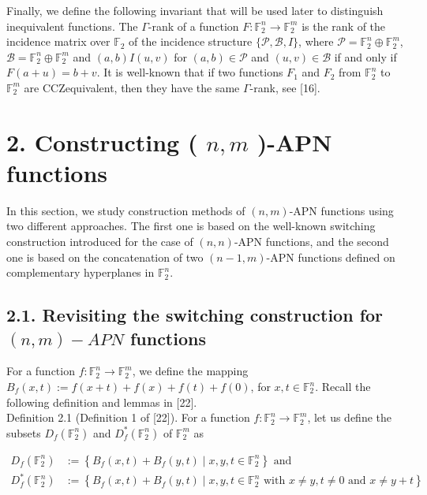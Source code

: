 \documentclass[10pt]{article}
\begin{document}
Finally, we define the following invariant that will be used later to distinguish inequivalent functions. The $\Gamma$-rank of a function $F: \mathbb{F}_{2}^{n} \rightarrow \mathbb{F}_{2}^{m}$ is the rank of the incidence matrix over $\mathbb{F}_{2}$ of the incidence structure $\{\mathcal{P}, \mathcal{B}, I\}$, where $\mathcal{P}=\mathbb{F}_{2}^{n} \oplus \mathbb{F}_{2}^{m}$, $\mathcal{B}=\mathbb{F}_{2}^{n} \oplus \mathbb{F}_{2}^{m}$ and $(a, b) I(u, v)$ for $(a, b) \in \mathcal{P}$ and $(u, v) \in \mathcal{B}$ if and only if $F(a+u)= b+v$. It is well-known that if two functions $F_{1}$ and $F_{2}$ from $\mathbb{F}_{2}^{n}$ to $\mathbb{F}_{2}^{m}$ are CCZequivalent, then they have the same $\Gamma$-rank, see [16].

\section*{2. Constructing ( $n, m$ )-APN functions}
In this section, we study construction methods of $(n, m)$-APN functions using two different approaches. The first one is based on the well-known switching construction introduced for the case of $(n, n)$-APN functions, and the second one is based on the concatenation of two $(n-1, m)$-APN functions defined on complementary hyperplanes in $\mathbb{F}_{2}^{n}$.

\subsection*{2.1. Revisiting the switching construction for $(n, m)-A P N$ functions}
For a function $f: \mathbb{F}_{2}^{n} \rightarrow \mathbb{F}_{2}^{m}$, we define the mapping $B_{f}(x, t):=f(x+t)+f(x)+ f(t)+f(0)$, for $x, t \in \mathbb{F}_{2}^{n}$. Recall the following definition and lemmas in [22].\\[0pt]
Definition 2.1 (Definition 1 of [22]). For a function $f: \mathbb{F}_{2}^{n} \rightarrow \mathbb{F}_{2}^{m}$, let us define the subsets $D_{f}\left(\mathbb{F}_{2}^{n}\right)$ and $D_{f}^{*}\left(\mathbb{F}_{2}^{n}\right)$ of $\mathbb{F}_{2}^{m}$ as

$$
\begin{aligned}
D_{f}\left(\mathbb{F}_{2}^{n}\right) & :=\left\{B_{f}(x, t)+B_{f}(y, t) \mid x, y, t \in \mathbb{F}_{2}^{n}\right\} \text { and } \\
D_{f}^{*}\left(\mathbb{F}_{2}^{n}\right) & :=\left\{B_{f}(x, t)+B_{f}(y, t) \mid x, y, t \in \mathbb{F}_{2}^{n} \text { with } x \neq y, t \neq 0 \text { and } x \neq y+t\right\}
\end{aligned}
$$
\end{document}
